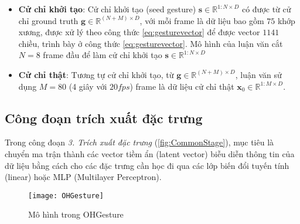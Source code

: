 \begin{itemize}
		\item \textbf{Cử chỉ khởi tạo}: Cử chỉ khởi tạo (seed gesture) $\mathbf{s} \in \mathbb{R}^{1:N \times D}$ có được từ cử chỉ ground truth $
		\mathbf{g} \in \mathbb{R}^{(N+M) \times D}$, với mỗi frame là dữ liệu bao gồm $75$ khớp xương, được xử lý theo công thức \autoref{eq:gesturevector} để được vector $1141$ chiều, trình bày ở công thức \autoref{eq:gesturevector}. Mô hình của luận văn cắt $N = 8$ frame đầu để làm cử chỉ khởi tạo $\mathbf{s} \in \mathbb{R}^{1:N \times D} $
		
		\item \textbf{Cử chỉ thật}: Tương tự cử chỉ khởi tạo, từ $
		\mathbf{g} \in \mathbb{R}^{(N+M) \times D}$, luận văn sử dụng $M = 80$ (4 giây với $20fps$) frame là dữ liệu cử chỉ thật $\mathbf{x}_{0} \in \mathbb{R}^{1:M \times D}$. 
\end{itemize}

\subsection{Công đoạn trích xuất đặc trưng}
\label{subsec:feature_extraction}

Trong công đoạn \textit{3. Trích xuất đặc trưng} (\autoref{fig:CommonStage}), mục tiêu là chuyển ma trận thành các vector tiềm ẩn (latent vector) biễu diễn thông tin của dữ liệu bằng cách cho các đặc trưng cần học đi qua các lớp biến đổi tuyến tính (linear) hoặc MLP (Multilayer Perceptron).



\begin{figure}[H]
	\centering
	\texttt{[image: OHGesture]}
	\caption{Mô hình trong OHGesture}
	\label{fig:OHGesture}
\end{figure}
\vspace{-10pt}

